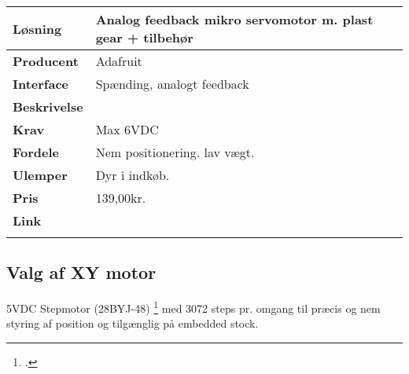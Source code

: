 \begin{table}[H] \centering
\begin{tabular}{|p{3cm}|p{11cm}|}
	\hline
	\textbf{Løsning}		
	    & Analog feedback mikro servomotor m. plast gear + tilbehør 
	\\ \hline
	\textbf{Producent} 		
	    & Adafruit
	\\ \hline
	\textbf{Interface} 		
	    & Spænding, analogt feedback
	\\ \hline
	\textbf{Beskrivelse} 	
	    & 
	\\ \hline
	\textbf{Krav} 			
	    & Max 6VDC
	\\ \hline
	\textbf{Fordele}		
	    & Nem positionering. lav vægt.
	\\ \hline
	\textbf{Ulemper} 		
	    & Dyr i indkøb.
	\\ \hline
	\textbf{Pris} 			
	    & 139,00kr.
	\\ \hline
	\textbf{Link} 			
	    & \url{}
	\\ \hline
	\multicolumn{2}{|c|}{} 
    \\ \hline
\end{tabular}
\end{table}

\subsection{Valg af XY motor}
5VDC Stepmotor (28BYJ-48) \footcite{28BYJ-48-5V}
med 3072 steps pr. omgang til præcis og nem styring af position og tilgænglig på embedded stock.